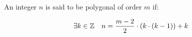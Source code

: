 %

\begin{definition}
    \label{def:Polygonal}
    \leanok
    An integer $n$ is said to be polygonal of order $m$ if:

    \[
        \exists k \in \mathbb{Z} \quad n = \frac{m-2}{2}\cdot (k \cdot (k-1)) + k
    \]
\end{definition}










